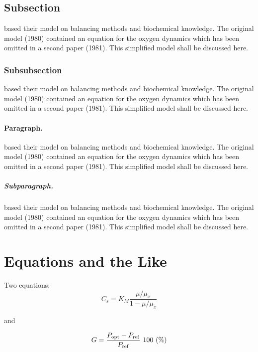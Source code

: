 \documentclass{kluwer}    %
\begin{document}
\begin{article}
\subsection{Subsection}
based their model on balancing methods and
biochemical know\-ledge. The original model (1980) contained an equation for the
oxygen dynamics which has been omitted in a second paper 
(1981). This simplified model shall be discussed here.

\subsubsection{Subsubsection}
\cite{Carr-Goldstein,Cohen-Jones88-book} 
based their model on balancing methods and
biochemical know\-ledge. The original model (1980) contained an equation for the
oxygen dynamics which has been omitted in a second paper 
(1981). This simplified model shall be discussed here.

\paragraph{Paragraph.}
\cite{Carr-Goldstein,Cohen-Jones88-book} 
based their model on balancing methods and
biochemical know\-ledge. The original model (1980) contained an equation for the
oxygen dynamics which has been omitted in a second paper 
(1981). This simplified model shall be discussed here.

\subparagraph{Subparagraph.}
\cite{Carr-Goldstein,Cohen-Jones88-book} 
based their model on balancing methods and
biochemical know\-ledge. The original model (1980) contained an equation for the
oxygen dynamics which has been omitted in a second paper 
(1981). This simplified model shall be discussed here.



\section{Equations and the Like}

Two equations:
\begin{equation}
    C_{s}  =  K_{M} \frac{\mu/\mu_{x}}{1-\mu/\mu_{x}} \label{ccs}
\end{equation}

and

\begin{equation}
    G = \frac{P_{\rm opt} - P_{\rm ref}}{P_{\rm ref}} \mbox{\ }100 \mbox{\ }(\%)
\end{equation}


\end{article}
\end{document}
